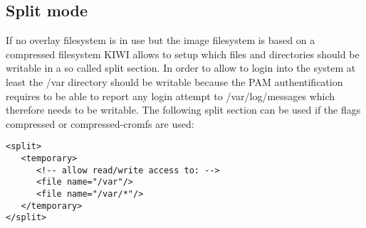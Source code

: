 \subsection{Split mode}

If no overlay filesystem is in use but the image filesystem is based on
a compressed filesystem KIWI allows to setup which files and directories
should be writable in a so called split section. In order to allow to
login into the system at least the /var directory should be writable
because the PAM authentification requires to be able to report any login
attempt to /var/log/messages which therefore needs to be writable. The
following split section can be used if the flags compressed or
compressed-cromfs are used:  

\begin{Command}{12cm}
\begin{verbatim}
<split>
   <temporary>
      <!-- allow read/write access to: -->
      <file name="/var"/>
      <file name="/var/*"/>
   </temporary>
</split>
\end{verbatim}
\end{Command}
